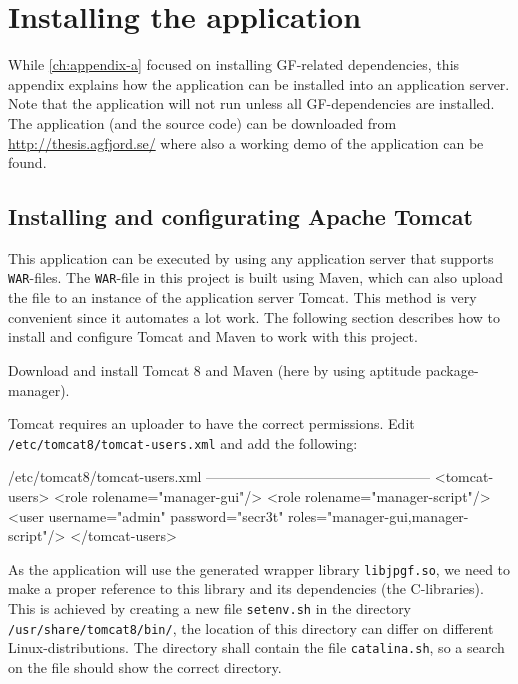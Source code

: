 \chapter{Installing the application}\label{ch:appendix-b}

While \autoref{ch:appendix-a} focused on installing GF-related dependencies, this appendix explains how the application can be installed into an application server. Note that the application will not run unless all GF-dependencies are installed. The application (and the source code) can be downloaded from \url{http://thesis.agfjord.se/} where also a working demo of the application can be found.

\section{Installing and configurating Apache Tomcat}
This application can be executed by using any application server that supports \texttt{WAR}-files. The \texttt{WAR}-file in this project is built using Maven, which can also upload the file to an instance of the application server Tomcat. This method is very convenient since it automates a lot work. The following section describes how to install and configure Tomcat and Maven to work with this project.

Download and install Tomcat 8 and Maven (here by using aptitude package-manager).


Tomcat requires an uploader to have the correct permissions.
\newline
Edit \texttt{/etc/tomcat8/tomcat-users.xml} and add the following:

\begin{terminal}
/etc/tomcat8/tomcat-users.xml
------------------------------------------------
<tomcat-users>
  <role rolename="manager-gui"/>
  <role rolename="manager-script"/>
  <user username="admin" password="secr3t" roles="manager-gui,manager-script"/>
</tomcat-users>
\end{terminal}

As the application will use the generated wrapper library \texttt{libjpgf.so}, we need to make a proper reference to this library and its dependencies (the C-libraries). This is achieved by creating a new file \texttt{setenv.sh} in the directory \texttt{/usr/share/tomcat8/bin/}, the location of this directory can differ on different Linux-distributions. The directory shall contain the file \texttt{catalina.sh}, so a search on the file should show the correct directory.


